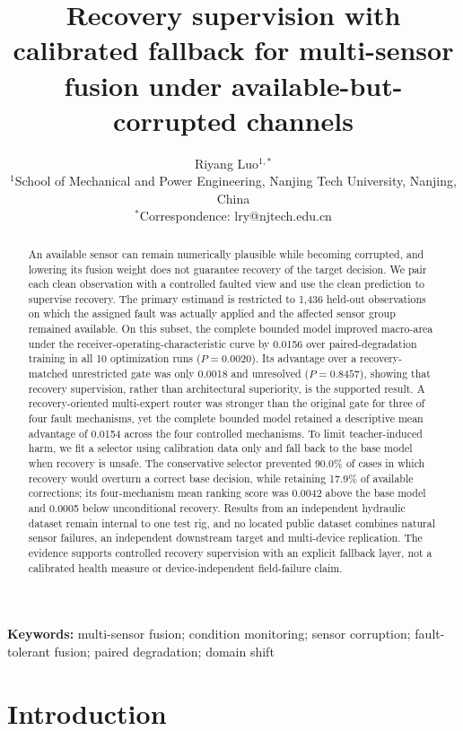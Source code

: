 \documentclass[11pt]{article}
\title{Recovery supervision with calibrated fallback for multi-sensor fusion under available-but-corrupted channels}
\author{Riyang Luo$^{1,*}$\\
\small $^1$School of Mechanical and Power Engineering, Nanjing Tech University, Nanjing, China\\
\small $^*$Correspondence: lry@njtech.edu.cn}
\date{}
\begin{document}
\maketitle

\begin{abstract}
An available sensor can remain numerically plausible while becoming corrupted, and lowering its fusion weight does not guarantee recovery of the target decision. We pair each clean observation with a controlled faulted view and use the clean prediction to supervise recovery. The primary estimand is restricted to 1,436 held-out observations on which the assigned fault was actually applied and the affected sensor group remained available. On this subset, the complete bounded model improved macro-area under the receiver-operating-characteristic curve by 0.0156 over paired-degradation training in all 10 optimization runs ($P=0.0020$). Its advantage over a recovery-matched unrestricted gate was only 0.0018 and unresolved ($P=0.8457$), showing that recovery supervision, rather than architectural superiority, is the supported result. A recovery-oriented multi-expert router was stronger than the original gate for three of four fault mechanisms, yet the complete bounded model retained a descriptive mean advantage of 0.0154 across the four controlled mechanisms. To limit teacher-induced harm, we fit a selector using calibration data only and fall back to the base model when recovery is unsafe. The conservative selector prevented 90.0\% of cases in which recovery would overturn a correct base decision, while retaining 17.9\% of available corrections; its four-mechanism mean ranking score was 0.0042 above the base model and 0.0005 below unconditional recovery. Results from an independent hydraulic dataset remain internal to one test rig, and no located public dataset combines natural sensor failures, an independent downstream target and multi-device replication. The evidence supports controlled recovery supervision with an explicit fallback layer, not a calibrated health measure or device-independent field-failure claim.
\end{abstract}

\noindent\textbf{Keywords:} multi-sensor fusion; condition monitoring; sensor corruption; fault-tolerant fusion; paired degradation; domain shift

\section{Introduction}
\end{document}

